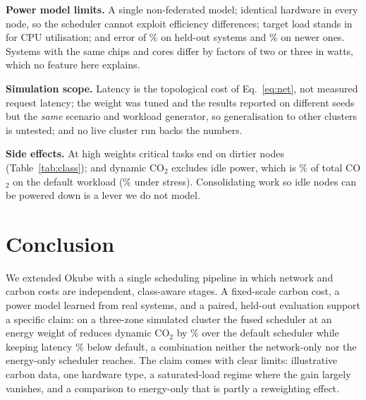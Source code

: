 \documentclass[conference]{IEEEtran}
\begin{document}
\textbf{Power model limits.} A single non-federated model; identical hardware in every node, so the scheduler cannot exploit efficiency differences; target load stands in for CPU utilisation; and error of \MapeXgb\% on held-out systems and \MapeTemporal\% on newer ones. Systems with the same chips and cores differ by factors of two or three in watts, which no feature here explains.

\textbf{Simulation scope.} Latency is the topological cost of Eq.~\eqref{eq:net}, not measured request latency; the weight was tuned and the results reported on different seeds but the \emph{same} scenario and workload generator, so generalisation to other clusters is untested; and no live cluster run backs the numbers.

\textbf{Side effects.} At high weights critical tasks end on dirtier nodes (Table~\ref{tab:class}); and dynamic CO$_2$ excludes idle power, which is \IdleShare\% of total CO$_2$ on the default workload (\IdleShareStress\% under stress). Consolidating work so idle nodes can be powered down is a lever we do not model.

\section{Conclusion}
We extended Okube with a single scheduling pipeline in which network and carbon costs are independent, class-aware stages. A fixed-scale carbon cost, a power model learned from \NSystemsKept{} real systems, and a paired, held-out evaluation support a specific claim: on a three-zone simulated cluster the fused scheduler at an energy weight of \HeadlineW{} reduces dynamic CO$_2$ by \FusedCO\% over the default scheduler while keeping latency \FusedLatCut\% below default, a combination neither the network-only nor the energy-only scheduler reaches. The claim comes with clear limits: illustrative carbon data, one hardware type, a saturated-load regime where the gain largely vanishes, and a comparison to energy-only that is partly a reweighting effect.

\end{document}
